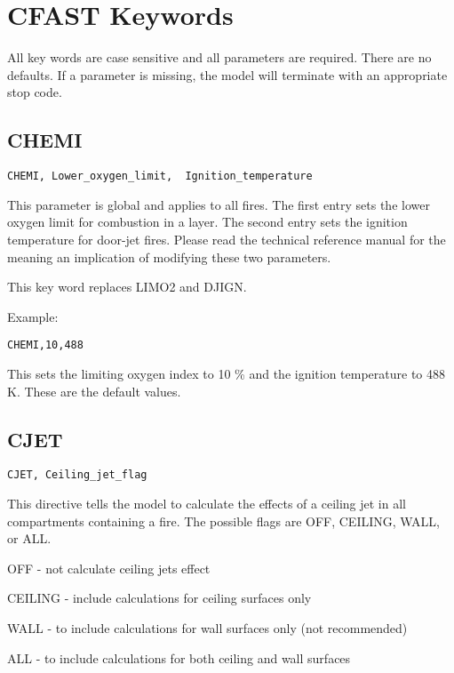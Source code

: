 \chapter{CFAST Keywords}

All key words are case sensitive and all parameters are required. There are no defaults. If a parameter is missing, the model will terminate with an appropriate stop code. 

\section{CHEMI}

\begin{lstlisting}
CHEMI, Lower_oxygen_limit,  Ignition_temperature
\end{lstlisting}

This parameter is global and applies to all fires. The first entry sets the lower oxygen limit for combustion in a layer. The second entry sets the ignition temperature for door-jet fires. Please read the technical reference manual for the meaning an implication of modifying these two parameters.

This key word replaces LIMO2 and DJIGN.

Example:

\begin{lstlisting}
CHEMI,10,488
\end{lstlisting}

This sets the limiting oxygen index to 10 \% and the ignition temperature to 488 K. These are the default values.

\section{CJET}

\begin{lstlisting}
CJET, Ceiling_jet_flag
\end{lstlisting}

This directive tells the model to calculate the effects of a ceiling jet in all compartments containing a fire. The possible flags are OFF, CEILING, WALL, or ALL.

OFF - not calculate ceiling jets effect

CEILING - include calculations for ceiling surfaces only

WALL - to include calculations for wall surfaces only (not recommended)

ALL - to include calculations for both ceiling and wall surfaces

